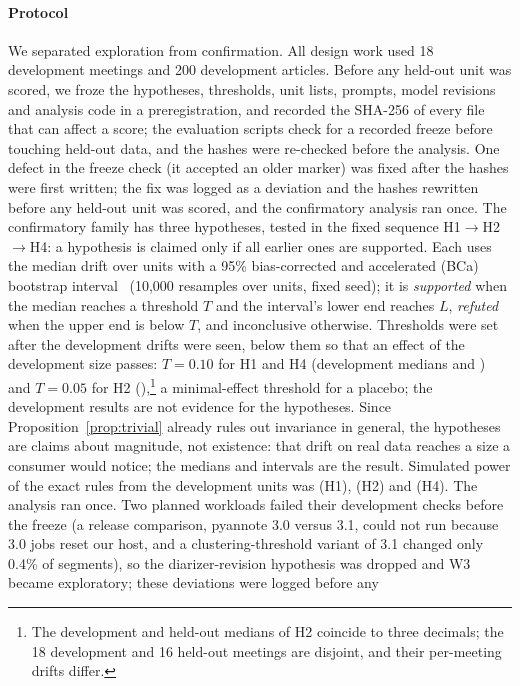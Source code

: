 \documentclass[conference]{IEEEtran}
\begin{document}
\paragraph*{Protocol} We separated exploration from confirmation. All design work used 18 development meetings and
200 development articles. Before any held-out unit was scored, we froze the hypotheses, thresholds, unit lists,
prompts, model revisions and analysis code in a preregistration, and recorded the SHA-256 of every file that can
affect a score; the evaluation scripts check for a recorded freeze before touching held-out data, and the hashes were
re-checked before the analysis. One defect in the freeze check (it accepted an older marker) was fixed after the
hashes were first written; the fix was logged as a deviation and the hashes rewritten before any held-out unit was
scored, and the confirmatory analysis ran once. The confirmatory family has three hypotheses, tested in the fixed sequence H1$\to$H2$\to$H4: a
hypothesis is claimed only if all earlier ones are supported. Each uses the median drift over units with a 95\% bias-corrected and accelerated (BCa)
bootstrap interval~\cite{bca} (10,000 resamples over units, fixed seed); it is \emph{supported} when the median
reaches a threshold $T$ and the interval's lower end reaches $L$, \emph{refuted} when the upper end is below $T$, and
inconclusive otherwise. Thresholds were set after the development drifts were seen, below them so that an effect of
the development size passes: $T=0.10$ for H1 and H4 (development medians \nDevHonemed{} and \nDevHfourmed) and $T=0.05$
for H2 (\nDevHtwomed),\footnote{The development and held-out medians of H2 coincide to three decimals; the 18
development and 16 held-out meetings are disjoint, and their per-meeting drifts differ.} a minimal-effect threshold for
a placebo; the development results are not evidence for the
hypotheses. Since Proposition~\ref{prop:trivial} already rules out invariance in general, the hypotheses are claims about
magnitude, not existence: that drift on real data reaches a size a consumer would notice; the medians and intervals
are the result. Simulated power of the exact rules from the development units was \nPowerHone{} (H1), \nPowerHtwo{} (H2)
and \nPowerHfour{} (H4). The analysis ran once. Two planned workloads failed their development checks before the
freeze (a release comparison, pyannote 3.0 versus 3.1, could not run because 3.0 jobs reset our host, and a
clustering-threshold variant of 3.1 changed only 0.4\% of segments),
so the diarizer-revision hypothesis was dropped and W3 became exploratory; these deviations were logged before any
\end{document}
